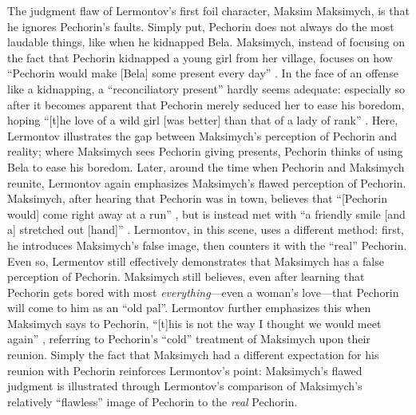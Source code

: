\documentclass[a4paper,12pt]{article}
\newcommand{\mcite}{\mancite\cite}
\begin{document}
    The judgment flaw of Lermontov's first foil character, Maksim Maksimych, is that he ignores
    Pechorin's faults. 
    Simply put, Pechorin does not always do the most laudable things, like when he kidnapped Bela.
    Maksimych, instead of focusing on the fact that Pechorin kidnapped a young girl from her village,
    focuses on how ``Pechorin would make [Bela] some present every day'' \mcite[35]{book}. In the face
    of an offense like a kidnapping, a ``reconciliatory present'' hardly seems adequate: especially so
    after it becomes apparent that Pechorin merely seduced her to ease his boredom, hoping ``[t]he
    love of a wild girl [was better] than that of a lady of rank'' \mcite[48]{book}. Here, Lermontov
    illustrates  the gap between Maksimych's perception of Pechorin and reality; where Maksimych
    sees Pechorin giving presents, Pechorin thinks of using Bela to ease his boredom. Later, around
    the time when Pechorin and Maksimych reunite, Lermontov again emphasizes Maksimych's flawed
    perception of Pechorin. Maksimych, after hearing that Pechorin was in town, believes that
    ``[Pechorin would] come right away at a run'' \mcite[59]{book}, but is instead met with ``a
    friendly smile [and a] stretched out [hand]'' \mcite[62]{book}. Lermontov, in this scene, uses a
    different method: first, he introduces Maksimych's false image, then counters it with the
    ``real'' Pechorin. Even so, Lermentov still effectively demonstrates that Maksimych has a false
    perception of Pechorin. Maksimych still believes, even after learning that Pechorin gets bored
    with most \textit{everything}---even a woman's love---that Pechorin will come to him as an ``old
    pal''. Lermontov further emphasizes this when Maksimych says to Pechorin, ``[t]his is not the
    way I thought we would meet again'' \mcite[63]{book}, referring to Pechorin's ``cold'' treatment
    of Maksimych upon their reunion. Simply the fact that Maksimych had a different expectation for
    his reunion with Pechorin reinforces Lermontov's point:
    Maksimych's flawed judgment is illustrated through Lermontov's comparison of Maksimych's relatively
    ``flawless'' image of Pechorin to the \textit{real} Pechorin.

\end{document}
